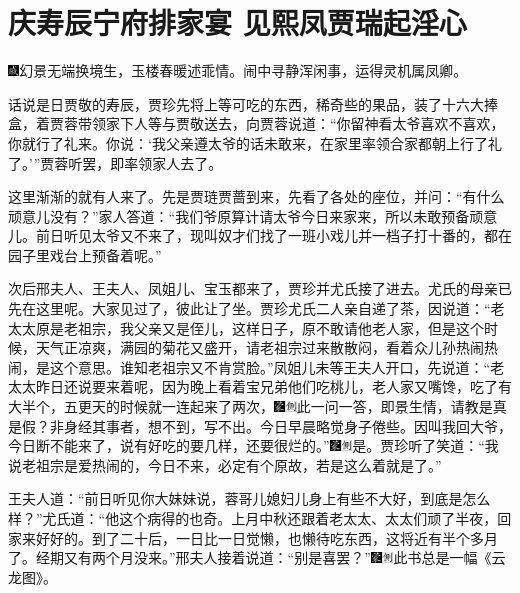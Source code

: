 

\chapter{庆寿辰宁府排家宴 见熙凤贾瑞起淫心}

{\includegraphics[width=3mm]{../Images/00005}幻景无端换境生，玉楼春暖述乖情。闹中寻静浑闲事，运得灵机属凤卿。}

话说是日贾敬的寿辰，贾珍先将上等可吃的东西，稀奇些的果品，装了十六大捧盒，着贾蓉带领家下人等与贾敬送去，向贾蓉说道：``你留神看太爷喜欢不喜欢，你就行了礼来。你说：`我父亲遵太爷的话未敢来，在家里率领合家都朝上行了礼了。'''贾蓉听罢，即率领家人去了。

这里渐渐的就有人来了。先是贾琏贾蔷到来，先看了各处的座位，并问：``有什么顽意儿没有？''家人答道：``我们爷原算计请太爷今日来家来，所以未敢预备顽意儿。前日听见太爷又不来了，现叫奴才们找了一班小戏儿并一档子打十番的，都在园子里戏台上预备着呢。''

次后邢夫人、王夫人、凤姐儿、宝玉都来了，贾珍并尤氏接了进去。尤氏的母亲已先在这里呢。大家见过了，彼此让了坐。贾珍尤氏二人亲自递了茶，因说道：``老太太原是老祖宗，我父亲又是侄儿，这样日子，原不敢请他老人家，但是这个时候，天气正凉爽，满园的菊花又盛开，请老祖宗过来散散闷，看着众儿孙热闹热闹，是这个意思。谁知老祖宗又不肯赏脸。''凤姐儿未等王夫人开口，先说道：``老太太昨日还说要来着呢，因为晚上看着宝兄弟他们吃桃儿，老人家又嘴馋，吃了有大半个，五更天的时候就一连起来了两次，{\includegraphics[width=3mm]{../Images/00006}\includegraphics[width=3mm]{../Images/00011}\footnotesize \kaishu 此一问一答，即景生情，请教是真是假？非身经其事者，想不到，写不出。}今日早晨略觉身子倦些。因叫我回大爷，今日断不能来了，说有好吃的要几样，还要很烂的。''{\includegraphics[width=3mm]{../Images/00006}\includegraphics[width=3mm]{../Images/00011}\footnotesize \kaishu 是。}贾珍听了笑道：``我说老祖宗是爱热闹的，今日不来，必定有个原故，若是这么着就是了。''

王夫人道：``前日听见你大妹妹说，蓉哥儿媳妇儿身上有些不大好，到底是怎么样？''尤氏道：``他这个病得的也奇。上月中秋还跟着老太太、太太们顽了半夜，回家来好好的。到了二十后，一日比一日觉懒，也懒待吃东西，这将近有半个多月了。经期又有两个月没来。''邢夫人接着说道：``别是喜罢？''{\includegraphics[width=3mm]{../Images/00006}\includegraphics[width=3mm]{../Images/00011}\footnotesize \kaishu 此书总是一幅《云龙图》。}

